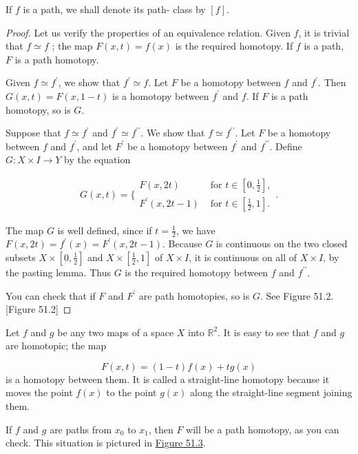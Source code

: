 If \(f\) is a path, we shall denote its path- class by \([ f]\).

\begin{proof}
Let us verify the properties of an equivalence relation.
Given \(f\), it is trivial that \(f \simeq f\) ; the map \(F( {x,t}) = f(x)\) is the required homotopy. If \(f\) is a path, \(F\) is a path homotopy.

Given \(f \simeq {f}^{\prime }\), we show that \(f^{\prime } \simeq f\). Let \(F\) be a homotopy between \(f\) and \(f^{\prime }\). Then \(G( {x,t}) = F( {x,1 - t})\) is a homotopy between \(f^{\prime }\) and \(f\). If \(F\) is a path homotopy, so is \(G\).

Suppose that \(f \simeq {f}^{\prime }\) and \(f^{\prime } \simeq {f}^{\prime \prime }\). We show that \(f \simeq {f}^{\prime \prime }\). Let \(F\) be a homotopy between \(f\) and \(f^{\prime }\), and let \(F^{\prime }\) be a homotopy between \(f^{\prime }\) and \(f^{\prime \prime }\). Define \(G : X \times I \rightarrow Y\) by the equation

\[
G( {x,t}) = \{ \begin{array}{ll} F( {x,{2t}}) & \text{ for }t \in [ {0,\frac{1}{2}}] , \\ F^{\prime }( {x,{2t} - 1}) & \text{ for }t \in [ {\frac{1}{2},1}] . \end{array}.
\]

The map \(G\) is well defined, since if \(t = \frac{1}{2}\), we have \(F( {x,{2t}}) = f^{\prime }(x) = F^{\prime }( {x,{2t} - 1})\). Because \(G\) is continuous on the two closed subsets \(X \times [ {0,\frac{1}{2}}]\) and \(X \times [ {\frac{1}{2},1}]\) of \(X \times I\), it is continuous on all of \(X \times I\), by the pasting lemma. Thus \(G\) is the required homotopy between \(f\) and \(f^{\prime \prime }\).

You can check that if \(F\) and \(F^{\prime }\) are path homotopies, so is \(G\). See Figure 51.2.
[Figure 51.2]
\end{proof}

\begin{centeredblock}
\begin{example}
\label{ex:\thesection.\theexample}
Let \(f\) and \(g\) be any two maps of a space \(X\) into \(\mathbb{R}^{2}\). It is easy to see that \(f\) and \(g\) are homotopic; the map

\[
F( {x,t}) = ( {1 - t}) f(x) + {tg}(x)
\]
is a homotopy between them. It is called a straight-line homotopy because it moves the point \(f(x)\) to the point \(g(x)\) along the straight-line segment joining them.

If \(f\) and \(g\) are paths from \(x_{0}\) to \(x_{1}\), then \(F\) will be a path homotopy, as you can check. This situation is pictured in \hyperref[fig:51.3]{Figure 51.3}.
\end{example}
\end{centeredblock}

